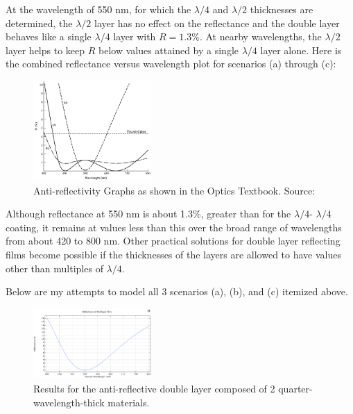 At the wavelength of 550 nm, for which the $\lambda/4$ and $\lambda/2$ thicknesses are determined, the $\lambda/2$ layer has no effect on the reflectance and the double layer behaves like a single $\lambda/4$ layer with $R = 1.3\%$. At nearby wavelengths, the $\lambda/2$ layer helps to keep $R$ below values attained by a single $\lambda/4$ layer alone. Here is the combined reflectance versus wavelength plot for scenarios (a) through (c):

\begin{figure}[ht!]
  \centering
  \includegraphics[width=0.4\textwidth]{Chapters/Figures/Chapter 4 Figures/Antireflectivity Graphs in the Optics Book.png}
  \caption{Anti-reflectivity Graphs as shown in the Optics Textbook. Source: \cite{pedrotti_introduction_2007}}
  \label{fig:antireflectivity graphs in the Optics book}
\end{figure}

Although reflectance at 550 nm is about 1.3\%, greater than for the $\lambda/4$- $\lambda/4$ coating, it remains at values less than this over the broad range of wavelengths from about 420 to 800 nm. Other practical solutions for double layer reflecting films become possible if the thicknesses of the layers are allowed to have values other than multiples of $\lambda/4$.

Below are my attempts to model all 3 scenarios (a), (b), and (c) itemized above.

\begin{figure}[ht!]
  \centering
  \includegraphics[width=0.4\textwidth]{Chapters/Figures/Chapter 4 Figures/Antireflective Figure a.png}
  \caption{Results for the anti-reflective double layer composed of 2 quarter-wavelength-thick materials.}
  \label{fig:Antireflective Figure a}
\end{figure}

